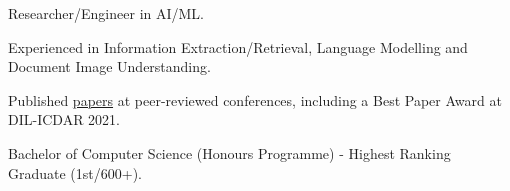 % 
\vspace{.6em}
\begin{zitemize}
    \item Researcher/Engineer in AI/ML.
    \item Experienced in Information Extraction/Retrieval, Language Modelling and Document Image Understanding.
    \item Published \href{https://scholar.google.com/citations?user=\gscholarid}{papers} at
    peer-reviewed conferences, including a Best Paper Award at DIL-ICDAR 2021.
    \item Bachelor of Computer Science (Honours Programme) - Highest Ranking Graduate (1st/600+).
\end{zitemize}
